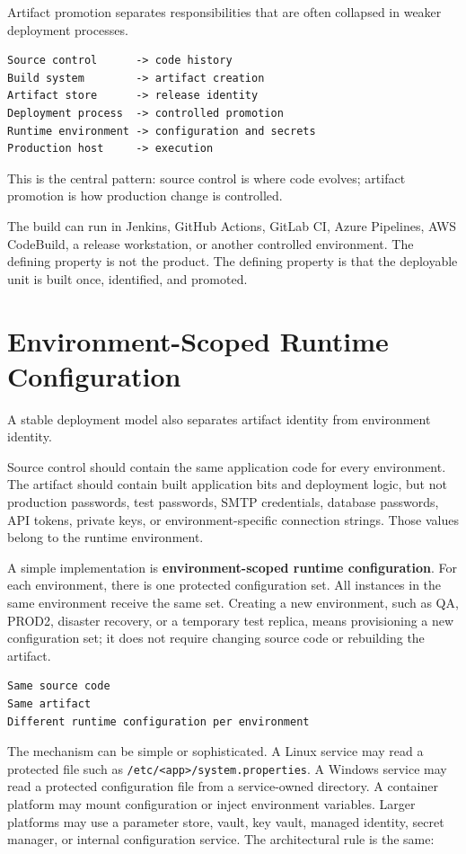 \documentclass[11pt]{article}
\begin{document}
Artifact promotion separates responsibilities that are often collapsed in weaker deployment processes.

\begin{lstlisting}
Source control      -> code history
Build system        -> artifact creation
Artifact store      -> release identity
Deployment process  -> controlled promotion
Runtime environment -> configuration and secrets
Production host     -> execution
\end{lstlisting}

This is the central pattern: source control is where code evolves; artifact promotion is how production change is controlled.

The build can run in Jenkins, GitHub Actions, GitLab CI, Azure Pipelines, AWS CodeBuild, a release workstation, or another controlled environment. The defining property is not the product. The defining property is that the deployable unit is built once, identified, and promoted.

\section{Environment-Scoped Runtime Configuration}

A stable deployment model also separates artifact identity from environment identity.

Source control should contain the same application code for every environment. The artifact should contain built application bits and deployment logic, but not production passwords, test passwords, SMTP credentials, database passwords, API tokens, private keys, or environment-specific connection strings. Those values belong to the runtime environment.

A simple implementation is \textbf{environment-scoped runtime configuration}. For each environment, there is one protected configuration set. All instances in the same environment receive the same set. Creating a new environment, such as QA, PROD2, disaster recovery, or a temporary test replica, means provisioning a new configuration set; it does not require changing source code or rebuilding the artifact.

\begin{lstlisting}
Same source code
Same artifact
Different runtime configuration per environment
\end{lstlisting}

The mechanism can be simple or sophisticated. A Linux service may read a protected file such as \texttt{/etc/<app>/system.properties}. A Windows service may read a protected configuration file from a service-owned directory. A container platform may mount configuration or inject environment variables. Larger platforms may use a parameter store, vault, key vault, managed identity, secret manager, or internal configuration service. The architectural rule is the same:
\end{document}
